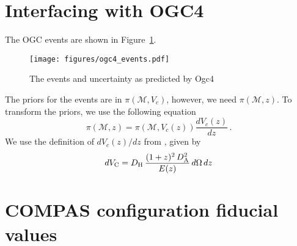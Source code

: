 \documentclass[twocolumn]{aastex631}
\newcommand{\Mc}{\ensuremath{\mathcal{M}}\xspace}
\begin{document}


\appendix

\section{Interfacing with OGC4}

The OGC events are shown in Figure~\ref{fig:ogc4_events}.

\begin{figure}[ht!]
    \begin{centering}
        \texttt{[image: figures/ogc4\_events.pdf]}
        \caption{
            The events and uncertainty as predicted by Ogc4
        }
        \label{fig:ogc4_events}
    \end{centering}
\end{figure}

The priors for the events are in $\pi(\Mc,V_c)$, however, we need $\pi(\Mc,z)$. To transform the priors, we use the following equation
\begin{equation}
    \pi(\Mc,z) = \pi(\Mc, V_c(z)) \frac{d V_c(z)}{dz}\, .
\end{equation}
We use the definition of $d V_c(z)/dz$ from \citep{Hogg:1999:arXiv}, given by 
\begin{equation}
dV_{\rm C}= D_{\rm H}\,\frac{(1+z)^2\,D_{\rm A}^2}{E(z)}\,d\Omega\,dz
\end{equation}



\section{COMPAS configuration fiducial values}\label{sec:appendix_COMPAS_fiducial}
\end{document}
